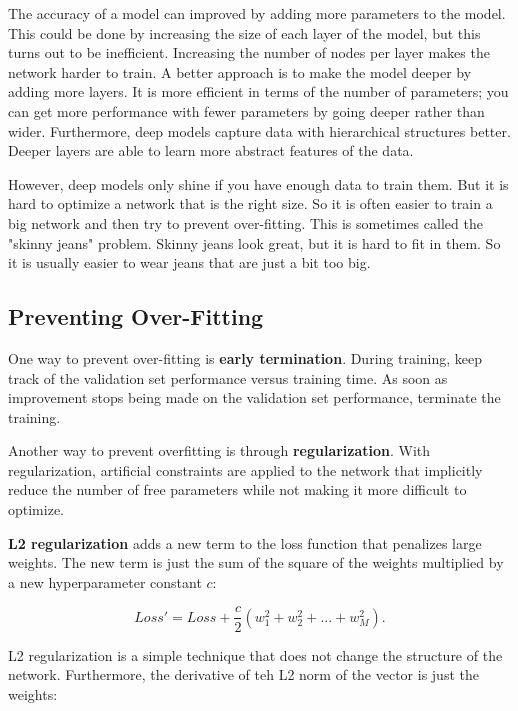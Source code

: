 The accuracy of a model can improved by adding more parameters to the model. This could be done by increasing the size of each layer of the model, but this turns out to be inefficient. Increasing the number of nodes per layer makes the network harder to train. A better approach is to make the model deeper by adding more layers. It is more efficient in terms of the number of parameters; you can get more performance with fewer parameters by going deeper rather than wider. Furthermore, deep models capture data with hierarchical structures better. Deeper layers are able to learn more abstract features of the data. 

However, deep models only shine if you have enough data to train them. But it is hard to optimize a network that is the right size. So it is often easier to train a big network and then try to prevent over-fitting. This is sometimes called the "skinny jeans" problem. Skinny jeans look great, but it is hard to fit in them. So it is usually easier to wear jeans that are just a bit too big. 

\subsection{Preventing Over-Fitting}

One way to prevent over-fitting is \textbf{early termination}. During training, keep track of the validation set performance versus training time. As soon as improvement stops being made on the validation set performance, terminate the training. 

Another way to prevent overfitting is through \textbf{regularization}. With regularization, artificial constraints are applied to the network that implicitly reduce the number of free parameters while not making it more difficult to optimize. 

\textbf{L2 regularization} adds a new term to the loss function that penalizes large weights. The new term is just the sum of the square of the weights multiplied by a new hyperparameter constant $c$: 

\begin{equation}
	Loss' = Loss + \frac{c}{2} (w_{1}^{2} + w_{2}^{2} + ... + w_{M}^{2}).
\end{equation}

L2 regularization is a simple technique that does not change the structure of the network. Furthermore, the derivative of teh L2 norm of the vector is just the weights:


